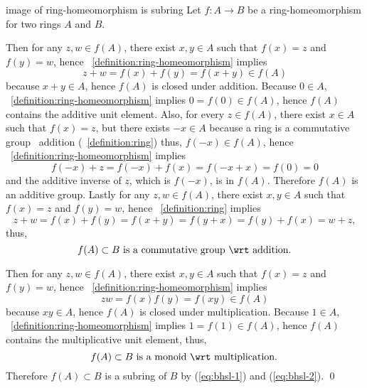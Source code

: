 \documentclass[17pt,landscape]{foils}
\begin{document}
{{{\begin{myproof}{image of ring-homeomorphism is subring}
	Let $f:A\to B$ be a ring-homeomorphism for two rings $A$ and $B$.
	\bit
	\item
		Then for any $z,w \in f(A)$, there exist $x,y\in A$ such that $f(x) = z$ and $f(y) = w$,
		hence ~\ref{definition:ring-homeomorphism} implies
		$$
			z + w = f(x) + f(y) = f(x+y) \in f(A)
		$$
		because $x+y\in A$,
		hence $f(A)$ is closed under addition.
		Because $0\in A$, ~\ref{definition:ring-homeomorphism} implies $0=f(0)\in f(A)$,
		hence $f(A)$ contains the additive unit element.
		Also, for every $z\in f(A)$, there exist $x\in A$ such that $f(x)=z$,
		but there exists $-x \in A$ because a ring is a commutative group \wrt\ addition (~\ref{definition:ring})
		thus, $f(-x) \in f(A)$,
		hence ~\ref{definition:ring-homeomorphism} implies
		$$
			f(-x) + z = f(-x) + f(x) = f(-x + x) = f(0) = 0
		$$
		and
		the additive inverse of $z$, which is $f(-x)$, is in $f(A)$.
		Therefore $f(A)$ is an additive group.
		Lastly for any $z,w \in f(A)$, there exist $x,y\in A$ such that
		$f(x) = z$ and $f(y) = w$,
		hence
		~\ref{definition:ring} implies
		$$
			z + w = f(x) + f(y) = f(x+y) = f(y+x) = f(y) + f(x) = w + z,
		$$
		thus,
		\begin{equation}
		\label{eq:bhsl-1}
			\mbox{
			$f(A)\subset B$ is a commutative group \wrt\ addition.
			}
		\end{equation}
	\item
		Then for any $z,w \in f(A)$, there exist $x,y\in A$ such that $f(x) = z$ and $f(y) = w$,
		hence ~\ref{definition:ring-homeomorphism} implies
		$$
			z w = f(x) f(y) = f(xy) \in f(A)
		$$
		because $xy\in A$,
		hence $f(A)$ is closed under multiplication.
		Because $1\in A$, ~\ref{definition:ring-homeomorphism}
		implies $1 = f(1)\in f(A)$,
		hence $f(A)$ contains the multiplicative unit element,
		thus,
		\begin{equation}
		\label{eq:bhsl-2}
			\mbox{
				$f(A)\subset B$ is a monoid \wrt\ multiplication.
			}
		\end{equation}
	\eit
	Therefore $f(A)\subset B$ is a subring of $B$ by (\ref{eq:bhsl-1}) and (\ref{eq:bhsl-2}).
	\qed
\end{myproof}

}}}
\end{document}
